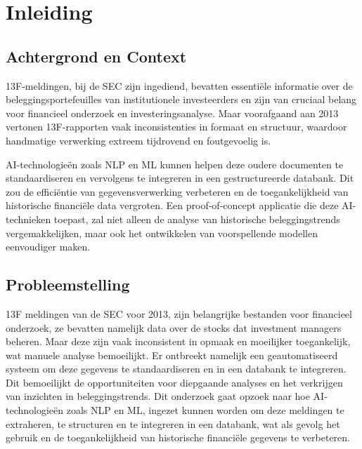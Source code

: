 


% 

\section{Inleiding}
\label{sec:inleiding}
\subsection{Achtergrond en Context}

13F-meldingen, bij de SEC zijn ingediend, bevatten essentiële informatie over de beleggingsportefeuilles van institutionele investeerders en zijn van cruciaal belang voor financieel onderzoek en investeringsanalyse. Maar voorafgaand aan 2013 vertonen 13F-rapporten vaak inconsistenties in formaat en structuur, waardoor handmatige verwerking extreem tijdrovend en foutgevoelig is. 

AI-technologieën zoals NLP en ML kunnen helpen deze oudere documenten te standaardiseren en vervolgens te integreren in een gestructureerde databank. Dit zou de efficiëntie van gegevensverwerking verbeteren en de toegankelijkheid van historische financiële data vergroten. Een proof-of-concept applicatie die deze AI-technieken toepast, zal niet alleen de analyse van historische beleggingstrends vergemakkelijken, maar ook het ontwikkelen van voorspellende modellen eenvoudiger maken.

\subsection{Probleemstelling}

13F meldingen van de SEC voor 2013, zijn belangrijke bestanden voor financieel onderzoek, ze bevatten namelijk data over de stocks dat investment managers beheren. Maar deze zijn vaak inconsistent in opmaak en moeilijker toegankelijk, wat manuele analyse bemoeilijkt. Er ontbreekt namelijk een geautomatiseerd systeem om deze gegevens te standaardiseren en in een databank te integreren. Dit bemoeilijkt de opportuniteiten voor diepgaande analyses en het verkrijgen van inzichten in beleggingstrends. Dit onderzoek gaat opzoek naar hoe AI-technologieën zoals NLP en ML, ingezet kunnen worden om deze meldingen te extraheren, te structuren en te integreren in een databank, wat als gevolg het gebruik en de toegankelijkheid van historische financiële gegevens te verbeteren.

